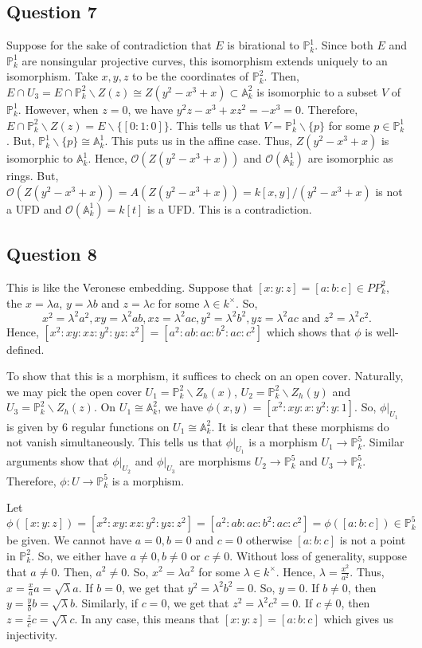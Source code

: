 \documentclass{article}
\newcommand{\PP}{\mathbb{P}}
\newcommand{\A}{\mathbb{A}}
\begin{document}
\subsection*{Question 7}
Suppose for the sake of contradiction that $E$ is birational to $\PP^1_k$. 
Since both $E$ and $\PP^1_k$ are nonsingular projective curves, 
this isomorphism extends uniquely to an isomorphism. 
Take $x,y,z$ to be the coordinates of $\PP^2_k$. 
Then, $ E \cap U_3 = E \cap \PP^2_k \backslash Z(z) \cong Z(y^2-x^3+x) \subset \A^2_k$ is isomorphic 
to a subset $V$ of $\PP^1_k$. However, when $z=0$, we have $y^2z-x^3+xz^2=-x^3=0$. Therefore, 
$E \cap \PP^2_k \backslash Z(z) = E \backslash \{[0:1:0]\}$. This tells us that $V = \PP^1_k \backslash \{p\}$ 
for some $p \in \PP^1_k$. But, $\PP^1_k \backslash \{p\} \cong \A^1_k$. This puts us in the affine case. 
Thus, $Z(y^2-x^3+x)$ is isomorphic to $\A^1_k$. Hence, $\mathcal{O}(Z(y^2-x^3+x))$ and $\mathcal{O}(\A^1_k)$ 
are isomorphic as rings. But, $\mathcal{O}(Z(y^2-x^3+x)) = A(Z(y^2-x^3+x)) = k[x,y]/(y^2-x^3+x)$ is 
not a UFD and $\mathcal{O}(\A^1_k) = k[t]$ is a UFD. This is a contradiction. 

\subsection*{Question 8}
This is like the Veronese embedding.  
Suppose that $[x:y:z]=[a:b:c] \in PP^2_k$, the $x=\lambda a$, $y=\lambda b$ and $z=\lambda c$ for some 
$\lambda \in k^\times$. So,  
$$
x^2=\lambda^2a^2,xy=\lambda^2ab,xz=\lambda^2ac,y^2=\lambda^2b^2,yz=\lambda^2ac 
\textrm{ and }
z^2=\lambda^2c^2.
$$ Hence, $[x^2:xy:xz:y^2:yz:z^2]=[a^2:ab:ac:b^2:ac:c^2]$ which shows that $\phi$ is well-defined. 

To show that this is a morphism, it suffices to check on an open cover. 
Naturally, we may pick the open cover $U_1 = \PP^2_k \backslash Z_h(x)$, 
$U_2 = \PP^2_k \backslash Z_h(y)$ and $U_3 = \PP^2_k \backslash Z_h(z)$. 
On $U_1 \cong \A^2_k$, we have $\phi(x,y) = [x^2:xy:x:y^2:y:1]$. 
So, $\phi\big|_{U_1}$ is given by $6$ regular functions on $U_1 \cong \A^2_k$. 
It is clear that these morphisms do not vanish simultaneously. 
This tells us that $\phi\big|_{U_1}$ is a morphism $U_1 \to \PP^5_k$. 
Similar arguments show that $\phi\big|_{U_2}$ and $\phi\big|_{U_3}$ are morphisms $U_2 \to \PP^5_k$ 
and $U_3 \to \PP^5_k$. Therefore, $\phi: U \to \PP^5_k$ is a morphism. 

Let $\phi([x:y:z]) = [x^2:xy:xz:y^2:yz:z^2]=[a^2:ab:ac:b^2:ac:c^2] = \phi([a:b:c]) \in \PP^5_k$ be given. 
We cannot have $a=0,b=0$ and $c=0$ otherwise $[a:b:c]$ is not a point in $\PP^2_k$. 
So, we either have $a \neq 0,b \neq 0$ or $c \neq 0$. Without loss of generality, suppose that $a\neq 0$. 
Then, $a^2 \neq 0$. So, $x^2 = \lambda a^2$ for some $\lambda \in k^\times$. Hence, $\lambda = \frac{x^2}{a^2}$.
Thus, $x = \frac{x}{a} a = \sqrt{\lambda} a$. If $b=0$, we get that $y^2 = \lambda^2b^2 = 0$. So, $y=0$. 
If $b\neq 0$, then $y = \frac{y}{b} b = \sqrt{\lambda} b$. 
Similarly, if $c=0$, we get that $z^2 = \lambda^2c^2 = 0$. 
If $c\neq 0$, then $z = \frac{z}{c} c = \sqrt{\lambda} c$. 
In any case, this means that $[x:y:z] = [a:b:c]$ which gives us injectivity. 
\end{document}
